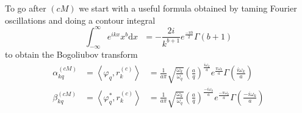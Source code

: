 \documentclass[12pt,a4paper]{article}
\newcommand{\dv}[1]{\mathrm{d} #1 \text{ }}
\begin{document}
To go after $(cM)$ we start with a useful formula obtained by taming Fourier oscillations and doing a contour integral
\begin{equation}
  \int_{-\infty}^\infty e^{ikx} x^b \dv{x} = -\frac{2i}{k^{b+1}} e^{\frac{-\pi b}{2}} \Gamma(b+1)
\end{equation}
to obtain the Bogoliubov transform
\begin{equation}
  \begin{array}{ccl}
    \alpha^{(cM)}_{kq} &= \left<\varphi_q, r_k^{(c)} \right> &= \frac{1}{a \pi} \sqrt{\frac{\omega_k}{\omega_q}} \left(\frac{a}{q}\right)^{\frac{i\omega_k}{a}} e^{\frac{\pi \omega_k}{a}} \Gamma\left(\frac{i\omega_k}{a}\right) \\
    \beta^{(cM)}_{kq} &= \left<\varphi_q^*, r_k^{(c)} \right> &= \frac{1}{a \pi} \sqrt{\frac{\omega_k}{\omega_q}} \left(\frac{a}{q}\right)^{\frac{-i\omega_k}{a}} e^{\frac{-\pi \omega_k}{a}} \Gamma\left(\frac{-i\omega_k}{a}\right) \\
  \end{array}
  \label{bogo1}
\end{equation}
\end{document}
